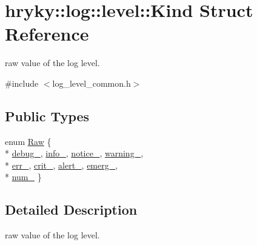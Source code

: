 \hypertarget{structhryky_1_1log_1_1level_1_1_kind}{\section{hryky\-:\-:log\-:\-:level\-:\-:Kind Struct Reference}
\label{structhryky_1_1log_1_1level_1_1_kind}
}


raw value of the log level.  




{\ttfamily \#include $<$log\-\_\-level\-\_\-common.\-h$>$}

\subsection*{Public Types}
\begin{DoxyCompactItemize}
\item 
enum \hyperlink{structhryky_1_1log_1_1level_1_1_kind_aa121006343f8971f566b5490b8001b21}{Raw} \{ \\*
\hyperlink{structhryky_1_1log_1_1level_1_1_kind_aa121006343f8971f566b5490b8001b21ac0a8f52590796a1f311111dae15c6af8}{debug\-\_\-}, 
\hyperlink{structhryky_1_1log_1_1level_1_1_kind_aa121006343f8971f566b5490b8001b21a101e156d0dbeb1bc9a4930fa365a5816}{info\-\_\-}, 
\hyperlink{structhryky_1_1log_1_1level_1_1_kind_aa121006343f8971f566b5490b8001b21a0d27806ab638f3d364a201799beb0915}{notice\-\_\-}, 
\hyperlink{structhryky_1_1log_1_1level_1_1_kind_aa121006343f8971f566b5490b8001b21a93a6f12ecffb8aaca86c6a2c63db2001}{warning\-\_\-}, 
\\*
\hyperlink{structhryky_1_1log_1_1level_1_1_kind_aa121006343f8971f566b5490b8001b21ae0769f08396c2cb3bf27ab8e8226f728}{err\-\_\-}, 
\hyperlink{structhryky_1_1log_1_1level_1_1_kind_aa121006343f8971f566b5490b8001b21a0c2b12dd607bc861ea48a54ffaecb235}{crit\-\_\-}, 
\hyperlink{structhryky_1_1log_1_1level_1_1_kind_aa121006343f8971f566b5490b8001b21a16a99a982de54fbc23410091030d2dd8}{alert\-\_\-}, 
\hyperlink{structhryky_1_1log_1_1level_1_1_kind_aa121006343f8971f566b5490b8001b21a6b7056a2b5be42b04fd0e3ebb05db821}{emerg\-\_\-}, 
\\*
\hyperlink{structhryky_1_1log_1_1level_1_1_kind_aa121006343f8971f566b5490b8001b21a2611b687250467d875d995119e336755}{num\-\_\-}
 \}
\end{DoxyCompactItemize}


\subsection{Detailed Description}
raw value of the log level. 

